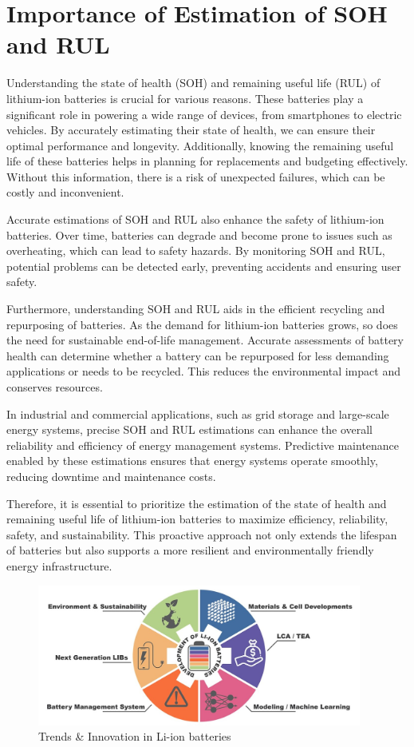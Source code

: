 \section{Importance of Estimation of SOH and RUL}
Understanding the state of health (SOH) and remaining useful life (RUL) of lithium-ion batteries is crucial for various reasons. These batteries play a significant role in powering a wide range of devices, from smartphones to electric vehicles. By accurately estimating their state of health, we can ensure their optimal performance and longevity. Additionally, knowing the remaining useful life of these batteries helps in planning for replacements and budgeting effectively. Without this information, there is a risk of unexpected failures, which can be costly and inconvenient.

Accurate estimations of SOH and RUL also enhance the safety of lithium-ion batteries. Over time, batteries can degrade and become prone to issues such as overheating, which can lead to safety hazards. By monitoring SOH and RUL, potential problems can be detected early, preventing accidents and ensuring user safety.

Furthermore, understanding SOH and RUL aids in the efficient recycling and repurposing of batteries. As the demand for lithium-ion batteries grows, so does the need for sustainable end-of-life management. Accurate assessments of battery health can determine whether a battery can be repurposed for less demanding applications or needs to be recycled. This reduces the environmental impact and conserves resources.

In industrial and commercial applications, such as grid storage and large-scale energy systems, precise SOH and RUL estimations can enhance the overall reliability and efficiency of energy management systems. Predictive maintenance enabled by these estimations ensures that energy systems operate smoothly, reducing downtime and maintenance costs.

Therefore, it is essential to prioritize the estimation of the state of health and remaining useful life of lithium-ion batteries to maximize efficiency, reliability, safety, and sustainability. This proactive approach not only extends the lifespan of batteries but also supports a more resilient and environmentally friendly energy infrastructure.

\begin{figure}[h!]
    \centering
    \includegraphics[width=0.95\textwidth]{graph.jpg} %
    \caption{Trends \& Innovation in Li-ion batteries}
    \label{fig:another}
\end{figure}

